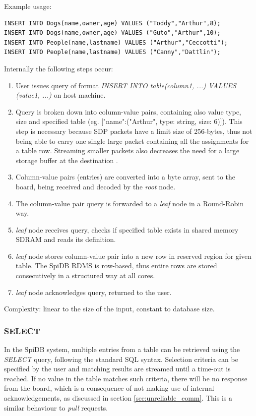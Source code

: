 Example usage:
\begin{lstlisting}
INSERT INTO Dogs(name,owner,age) VALUES ("Toddy","Arthur",8);
INSERT INTO Dogs(name,owner,age) VALUES ("Guto","Arthur",10);
INSERT INTO People(name,lastname) VALUES ("Arthur","Ceccotti");
INSERT INTO People(name,lastname) VALUES ("Canny","Dattlin");
\end{lstlisting}

Internally the following steps occur:
\begin{enumerate}
\item User issues query of format \textit{INSERT INTO table(column1, ...) VALUES (value1, ...)} on host machine.
\item Query is broken down into column-value pairs, containing also value type, size and specified table (eg. ["name":("Arthur", type: string, size: 6)]). This step is necessary because SDP packets have a limit size of 256-bytes, thus not being able to carry one single large packet containing all the assignments for a table row. Streaming smaller packets also decreases the need for a large storage buffer at the destination \cite{sdp}.
\item Column-value pairs (entries) are converted into a byte array, sent to the board, being received and decoded by the \textit{root} node.
\item The column-value pair query is forwarded to a \textit{leaf} node in a Round-Robin way.
\item \textit{leaf} node receives query, checks if specified table exists in shared memory SDRAM and reads its definition.
\item \textit{leaf} node stores column-value pair into a new row in reserved region for given table. The SpiDB RDMS is row-based, thus entire rows are stored consecutively in a structured way at all cores.
\item \textit{leaf} node acknowledges query, returned to the user.
\end{enumerate}

Complexity: linear to the size of the input, constant to database size.

\subsubsection{SELECT}   
In the SpiDB system, multiple entries from a table can be retrieved using the \textit{SELECT} query, following the standard SQL syntax. Selection criteria can be specified by the user and matching results are streamed until a time-out is reached. If no value in the table matches such criteria, there will be no response from the board, which is a consequence of not making use of internal acknowledgements, as discussed in section \ref{sec:unreliable_comm}. This is a similar behaviour to \textit{pull} requests. 

